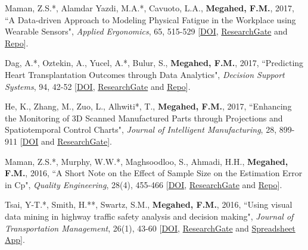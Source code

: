 \documentclass[margin,line]{res}
\begin{document}
\begin{resume}
\vspace{-1.5mm}
Maman, Z.S.*, Alamdar Yazdi, M.A.*, Cavuoto, L.A., \textbf{Megahed, F.M.}, 2017, ``A Data-driven Approach to Modeling Physical Fatigue in the Workplace using Wearable Sensors", \textit{Applied Ergonomics}, 65, 515-529 [\faFile*\href{https://doi.org/10.1016/j.apergo.2017.02.001}{DOI}, \faResearchgate \href{https://www.researchgate.net/publication/314162725_A_data-driven_approach_to_modeling_physical_fatigue_in_the_workplace_using_wearable_sensors}{ResearchGate} and \faGithub \href{https://github.com/zahrame/Fatigue-modeling.git}{Repo}].


\vspace{-1.5mm}
Dag, A.*, Oztekin, A., Yucel, A.*, Bulur, S., \textbf{Megahed, F.M.}, 2017, ``Predicting Heart Transplantation Outcomes through Data Analytics", \textit{Decision Support Systems}, 94, 42-52 [\faFile*\href{https://doi.org/10.1016/j.dss.2016.10.005}{DOI}, \newline  \faResearchgate \href{https://www.researchgate.net/publication/309696268_Predicting_heart_transplantation_outcomes_through_data_analytics}{ResearchGate} and \faGithub \href{https://github.com/azd0033/A-Hybrid-Data-Analytical-Approach-to-Predict-Heart-Transplant-Success}{Repo}].

\vspace{-1.5mm}
He, K., Zhang, M., Zuo, L., Alhwiti*, T., \textbf{Megahed, F.M.}, 2017, ``Enhancing the Monitoring of 3D Scanned Manufactured Parts through Projections and Spatiotemporal Control Charts", \textit{Journal of Intelligent Manufacturing}, 28, 899-911 [\faFile*\href{https://doi.org/10.1007/s10845-014-1025-1}{DOI} and \faResearchgate \href{https://www.researchgate.net/publication/284846896_Enhancing_the_monitoring_of_3D_scanned_manufactured_parts_through_projections_and_spatiotemporal_control_charts}{ResearchGate}].

\vspace{-1.5mm}
Maman, Z.S.*, Murphy, W.W.*, Maghsoodloo, S., Ahmadi, H.H., \textbf{Megahed, F.M.}, 2016, ``A Short Note on the Effect of Sample Size on the Estimation Error in Cp", \textit{Quality Engineering}, 28(4), 455-466 [\faFile*\href{https://doi.org/10.1080/08982112.2016.1172091}{DOI}, \faResearchgate \href{https://www.researchgate.net/publication/304338885_A_short_note_on_the_effect_of_sample_size_on_the_estimation_error_in_C_p}{ResearchGate} and \faGithub \href{https://github.com/zahrame/Process-Capability-tool}{Repo}].

\vspace{-1.5mm}
Tsai, Y-T.*, Smith, H.**, Swartz, S.M., \textbf{Megahed, F.M.}, 2016, ``Using visual data mining in highway traffic safety analysis and decision making", \textit{Journal of Transportation Management}, 26(1), 43-60 [\faFile*\href{https://doi.org/10.22237/jotm/1435709040}{DOI}, \faResearchgate \href{https://www.researchgate.net/publication/305683455_Using_Visual_Data_Mining_in_Traffic_Safety_Analysis_and_Decision_Making}{ResearchGate} and \faChartBar \href{https://www.dropbox.com/sh/azdbybx7v4hrzn1/AADSj7ACfZ0H2rtFbmdliGKta?dl=0}{Spreadsheet App}].


\end{resume}
\end{document}
